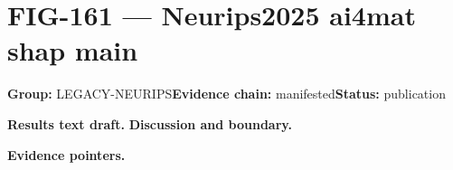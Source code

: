 \clearpage
\section{FIG-161 --- Neurips2025 ai4mat shap main}
\label{figpage:fig-161}
\textbf{Group:} LEGACY-NEURIPS\quad \textbf{Evidence chain:} manifested\quad \textbf{Status:} publication

\textbf{Results text draft.} 
\textbf{Discussion and boundary.} 


\textbf{Evidence pointers.}



\vfill
